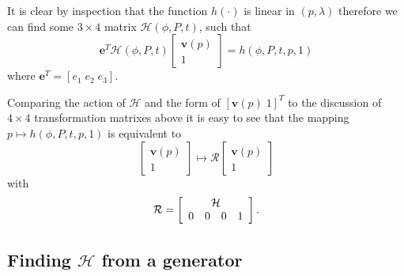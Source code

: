 It is clear by inspection that the function $h(\cdot)$ is linear in $(p,\lambda)$ 
therefore we can find some $3\times4$ matrix $\mathcal{H}(\phi, P, t)$, such that
\begin{equation}
\mathbf{e}^T 
 \mathcal{H}(\phi, P, t) \left[
\begin{array}{c}
\mathbf{v}(p) \\ 1
\end{array} 
\right] = h(\phi, P, t, p, 1) \label{eqn:hi}
\end{equation}
where $\mathbf{e}^T = \left[ e_1 \; e_2 \; e_3 \right]$.

Comparing the action of $\mathcal{H}$ and the form of $\left[ \mathbf{v}(p) \; 1 \right]^T$
to the discussion of $4\times4$ transformation matrixes above it is easy to
see that the mapping $p \mapsto h(\phi, P, t, p, 1)$ is equivalent to
\[
\left[
\begin{array}{c}
\mathbf{v}(p) \\ 1
\end{array} 
\right]
\mapsto
\mathcal{R}
\left[
\begin{array}{c}
\mathbf{v}(p) \\ 1
\end{array} 
\right]
\]
with
\[
\mathcal{R} = \left[
\begin{array}{cccc}
\multicolumn{4}{c}{\mathcal{H}} \\
                 0 & 0 & 0 & 1 
\end{array}
\right].
\]

\subsection{Finding $\mathcal{H}$ from a generator}

